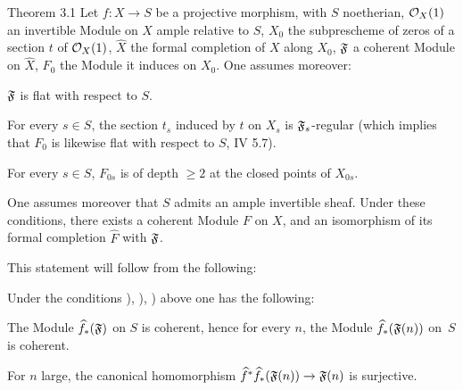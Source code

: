\setcounter{equation}{16}%
\label{XII.3.1}%
\begin{enonce*}{Theorem 3.1\ndemark}
Let $f:X\to S$ be a projective morphism, with $S$ noetherian, $\mathcal{O}_X(1)$ an invertible Module on $X$ ample relative to $S$, $X_0$ the subprescheme of zeros of a section $t$ of $\mathcal{O}_X(1)$, $\widehat{X}$ the formal completion of $X$ along $X_0$, $\mathfrak{F}$ a coherent Module on $\widehat{X}$, $F_0$ the Module it induces on $X_0$. One assumes moreover:
\begin{enumeratea}
\item\label{XII.3.1a}
$\mathfrak{F}$ is flat with respect to $S$.
\item\label{XII.3.1b}
For every $s\in S$, the section $t_s$ induced by $t$ on $X_s$ is $\mathfrak{F}_s$-regular (which implies that $F_0$ is likewise flat with respect to $S$, \cf \textup{ IV 5.7}).
\item\label{XII.3.1c}
For every $s\in S$, $F_{0s}$ is of depth $\geq 2$ at the closed points of $X_{0s}$.
\end{enumeratea}
One assumes moreover that $S$ admits an ample invertible sheaf. Under these conditions, there exists a coherent Module $F$ on $X$, and an isomorphism of its formal completion $\widehat{F}$ with $\mathfrak{F}$.
\end{enonce*}

This statement will follow from the following:

\begin{corollary} \label{XII.3.2}
Under the conditions ), ), ) above one has the following:
\begin{enumeratei}
\item
The Module $\widehat{f}_\ast(\mathfrak{F})$ on $S$ is coherent, hence for every $n$, the Module $\widehat{f}_\ast(\mathfrak{F}(n))$ on~$S$ is coherent.
\item
For $n$ large, the canonical homomorphism $\widehat{f}^\ast\widehat{f}_\ast(\formelF(n))\to \formelF(n)$ is surjective.
\end{enumeratei}
\end{corollary}

